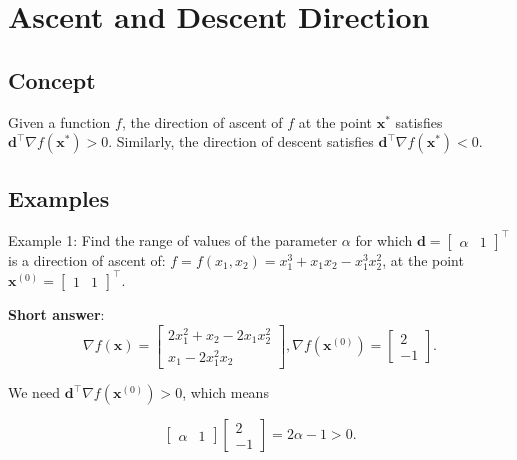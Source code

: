 \section{Ascent and Descent Direction}

\subsection{Concept}
Given a function \(f\), the direction of ascent of \(f\) at the point \(\boldsymbol{x}^{*}\) satisfies \(\boldsymbol{d}^{\top} \nabla f\left(\boldsymbol{x}^{*}\right)>0\). Similarly, the direction of descent satisfies \(\boldsymbol{d}^{\top} \nabla f\left(\boldsymbol{x}^{*}\right)<0\).

\subsection{Examples}
Example 1: Find the range of values of the parameter \(\alpha\) for which \(\boldsymbol{d}=\left[\begin{array}{ll}\alpha & 1\end{array}\right]^{\top}\) is a direction of ascent of: \(f=f\left(x_{1}, x_{2}\right)=x_{1}^{3}+x_{1} x_{2}-x_{1}^{3} x_{2}^{2}\), at the point \(\boldsymbol{x}^{(0)}=\left[\begin{array}{ll}1 & 1\end{array}\right]^{\top}\).

\textbf{Short answer}:
\[\nabla f(\boldsymbol{x})=\left[\begin{array}{c}2 x_{1}^{2}+x_{2}-2 x_{1} x_{2}^{2} \\ x_{1}-2 x_{1}^{2} x_{2}\end{array}\right], \nabla f\left(\boldsymbol{x}^{(0)}\right)=\left[\begin{array}{c}2 \\ -1\end{array}\right]. \]

We need \(\boldsymbol{d}^{\top} \nabla f\left(\boldsymbol{x}^{(0)}\right)>0\), which means

\[
	\left[\begin{array}{ll}
		\alpha & 1
	\end{array}\right]\left[\begin{array}{c}
		2 \\
		-1
	\end{array}\right]=2 \alpha-1>0.
\]

